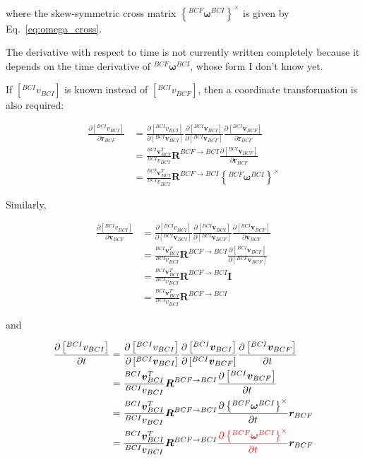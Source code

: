 \documentclass[]{article}
\newcommand{\vb}[1]{\bm{#1}} %
\newcommand{\pd}[2]{\frac{\partial #1}{\partial #2}} %
\begin{document}
where the skew-symmetric cross matrix $\left\{ ^{BCF} \vb{\omega}^{BCI} \right\}^{\times}$ is given by Eq.~\eqref{eq:omega_cross}.

The derivative with respect to time is not currently written completely because it depends on the time derivative of $^{BCF} \vb{\omega}^{BCI}$, whose form I don't know yet.

If $\left[^{BCI} v_{BCI} \right]$ is known instead of $\left[^{BCI} v_{BCF} \right]$, then a coordinate transformation is also required:

\begin{align}
	\pd{ \left[^{BCI} v_{BCI} \right] }{\vb{r}_{BCF}} &= \pd{\left[ ^{BCI} v_{BCI} \right]}{\left[ ^{BCI} \vb{v}_{BCI} \right]} \pd{\left[ ^{BCI} \vb{v}_{BCI} \right]}{\left[ ^{BCI} \vb{v}_{BCF} \right]} \pd{\left[ ^{BCI} \vb{v}_{BCF} \right]}{\vb{r}_{BCF}} \\
	&= \frac{^{BCI} \vb{v}_{BCI}^T}{^{BCI} v_{BCI}} \vb{R}^{BCF \rightarrow BCI} 
	\pd{\left[ ^{BCI} \vb{v}_{BCF} \right]}{\vb{r}_{BCF}} \\
	&= \frac{^{BCI} \vb{v}_{BCI}^T}{^{BCI} v_{BCI}} \vb{R}^{BCF \rightarrow BCI}
	\left\{ ^{BCF} \vb{\omega}^{BCI} \right\}^{\times}
\end{align}

Similarly,

\begin{align}
	\pd{ \left[^{BCI} v_{BCI} \right] }{\vb{v}_{BCF}} &= \pd{\left[ ^{BCI} v_{BCI} \right]}{\left[ ^{BCI} \vb{v}_{BCI} \right]} \pd{\left[ ^{BCI} \vb{v}_{BCI} \right]}{\left[ ^{BCI} \vb{v}_{BCF} \right]} \pd{\left[ ^{BCI} \vb{v}_{BCF} \right]}{\vb{v}_{BCF}} \\
	&= \frac{^{BCI} \vb{v}_{BCI}^T}{^{BCI} v_{BCI}} \vb{R}^{BCF \rightarrow BCI}
	\pd{\left[ ^{BCI} \vb{v}_{BCF} \right]}{ \left[ ^{BCF} \vb{v}_{BCF} \right]} \\
	&= \frac{^{BCI} \vb{v}_{BCI}^T}{^{BCI} v_{BCI}} \vb{R}^{BCF \rightarrow BCI}
	\vb{I} \\
	&= \frac{^{BCI} \vb{v}_{BCI}^T}{^{BCI} v_{BCI}} \vb{R}^{BCF \rightarrow BCI}
\end{align}

and

\begin{align}
	\pd{ \left[^{BCI} v_{BCI} \right] }{t} &= \pd{\left[ ^{BCI} v_{BCI} \right]}{\left[ ^{BCI} \vb{v}_{BCI} \right]} \pd{\left[ ^{BCI} \vb{v}_{BCI} \right]}{\left[ ^{BCI} \vb{v}_{BCF} \right]} \pd{\left[ ^{BCI} \vb{v}_{BCF} \right]}{t} \\
	&= \frac{^{BCI} \vb{v}_{BCI}^T}{^{BCI} v_{BCI}} \vb{R}^{BCF \rightarrow BCI}
	\pd{\left[ ^{BCI} \vb{v}_{BCF} \right]}{t} \\
	&= \frac{^{BCI} \vb{v}_{BCI}^T}{^{BCI} v_{BCI}} \vb{R}^{BCF \rightarrow BCI} 
	\pd{\left\{ ^{BCF} \vb{\omega}^{BCI} \right\}^{\times}}{t} \vb{r}_{BCF} \\
	&= \frac{^{BCI} \vb{v}_{BCI}^T}{^{BCI} v_{BCI}} \vb{R}^{BCF \rightarrow BCI} {\color{red} \pd{\left\{ ^{BCF} \vb{\omega}^{BCI} \right\}^{\times}}{t}} \vb{r}_{BCF}
\end{align}
\end{document}
